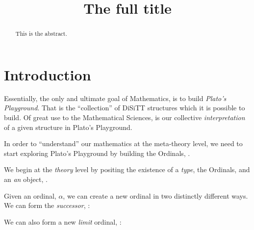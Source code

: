 \documentclass[a4paper]{amsart}
\begin{document}
\sloppy

\title[A short title]{The full title}

%

\begin{abstract}
This is the abstract.
\end{abstract}
\maketitle
\tableofcontents

\section{Introduction}

Essentially, the only and ultimate goal of Mathematics, is to build
\emph{Plato's Playground}. That is the ``collection'' of DiSiTT structures which
it is possible to build. Of great use to the Mathematical Sciences, is our
collective \emph{interpretation} of a given structure in Plato's Playground.

In order to ``understand'' our mathematics at the meta-theory level, we need to
start exploring Plato's Playground by building the Ordinals, \Ordinal.

We begin at the \emph{theory} level by positing the existence of a \emph{type},
the Ordinals, \Ordinal and an \emph{an} object, \judgement{\zero}{\Ordinal}.

\begin{deAxiom}
\conclusion{}{\judgement{\Ordinal}{\Universe}}
\end{deAxiom}

\begin{deAxiom}
\conclusion{}{\judgement{\zero}{\Ordinal}}
\end{deAxiom}

Given an ordinal, $\alpha$, we can create a new ordinal in two distinctly
different ways. We can form the \emph{successor}, \successor{\alpha}:

\begin{deAxiom}
\hypothesis{\Gamma}{\judgement{\alpha}{\Ordinal}}
\conclusion{\Gamma}{\judgement{\successor{\alpha}}{\Ordinal}}
\end{deAxiom}

We can also form a new \emph{limit} ordinal, \limitOrd{\alpha}:

\begin{deAxiom}
\hypothesis{\Gamma}{\judgement{\alpha}{\Ordinal}}
\conclusion{\Gamma}{\judgement{\limitOrd{\alpha}}{\Ordinal}}
\end{deAxiom}
\end{document}
